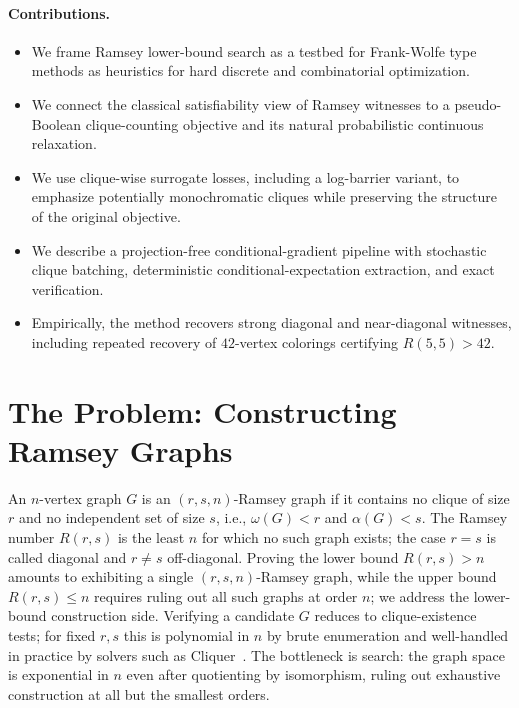 \documentclass{article}
\begin{document}
\paragraph{Contributions.}
\begin{itemize}
  \item We frame Ramsey lower-bound search as a testbed for Frank-Wolfe type methods as heuristics for hard discrete and combinatorial optimization.
  \item We connect the classical satisfiability view of Ramsey witnesses to a pseudo-Boolean clique-counting objective and its natural probabilistic continuous relaxation.
  \item We use clique-wise surrogate losses, including a log-barrier variant, to emphasize potentially monochromatic cliques while preserving the structure of the original objective.
  \item We describe a projection-free conditional-gradient pipeline with stochastic clique batching, deterministic conditional-expectation extraction, and exact verification.
  \item Empirically, the method recovers strong diagonal and near-diagonal witnesses, including repeated recovery of $42$-vertex colorings certifying $R(5,5)>42$.
\end{itemize}
\fi


\section{The Problem: Constructing Ramsey Graphs}\label{sec:problem}

An $n$-vertex graph $G$ is an $(r,s,n)$-Ramsey graph if it contains no clique of size $r$ and no independent set of size $s$, i.e., $\omega(G) < r$ and $\alpha(G) < s$. The Ramsey number $R(r,s)$ is the least $n$ for which no such graph exists; the case $r = s$ is called diagonal and $r \neq s$ off-diagonal. Proving the lower bound $R(r,s) > n$ amounts to exhibiting a single $(r,s,n)$-Ramsey graph, while the upper bound $R(r,s) \leq n$ requires ruling out all such graphs at order $n$; we address the lower-bound construction side. Verifying a candidate $G$ reduces to clique-existence tests; for fixed $r,s$ this is polynomial in $n$ by brute enumeration and well-handled in practice by solvers such as Cliquer~\cite{niskanen2003cliquer}. The bottleneck is search: the graph space is exponential in $n$ even after quotienting by isomorphism, ruling out exhaustive construction at all but the smallest orders.
\end{document}
